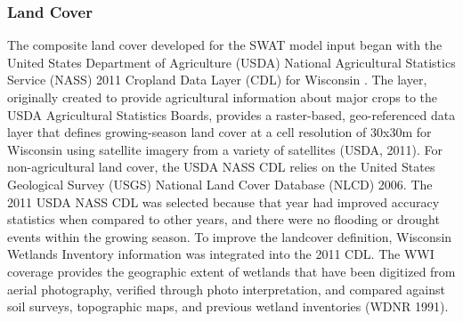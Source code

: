 \subsubsection{Land Cover}\label{sec:land_cover}
The composite land cover developed for the SWAT model input began with the United States Department of Agriculture (USDA) National Agricultural Statistics Service (NASS) 2011 Cropland Data Layer (CDL) for Wisconsin \cite{usda_cdl_2011}. The layer, originally created to provide agricultural information about major crops to the USDA Agricultural Statistics Boards, provides a raster-based, geo-referenced data layer that defines growing-season land cover at a cell resolution of 30x30m for Wisconsin using satellite imagery from a variety of satellites (USDA, 2011). For non-agricultural land cover, the USDA NASS CDL relies on the United States Geological Survey (USGS) National Land Cover Database (NLCD) 2006. The 2011 USDA NASS CDL was selected because that year had improved accuracy statistics when compared to other years, and there were no flooding or drought events within the growing season. To improve the landcover definition, Wisconsin Wetlands Inventory information was integrated into the 2011 CDL. The WWI coverage provides the geographic extent of wetlands that have been digitized from aerial photography, verified through photo interpretation, and compared against soil surveys, topographic maps, and previous wetland inventories (WDNR 1991).